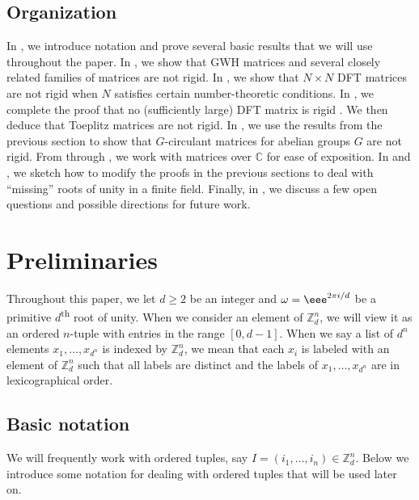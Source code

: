 \documentclass{toc}
\renewcommand\Z{{\mathbb{Z}}}
\renewcommand\C{{\mathbb{C}}}
\newcommand{\ts}{\textsuperscript}
\begin{document}
\subsection{Organization}
In , we introduce notation and prove several basic results that we will use throughout the paper.  In , we show that %
GWH matrices  %
and several closely related families of matrices are not rigid.  In , we show that $N \times N$ %
DFT %
 matrices are not rigid when $N$ satisfies certain number-theoretic
%
conditions.   %
In , we complete the proof that %
no (sufficiently large) DFT matrix is rigid%
. We then deduce that %
%
 Toeplitz matrices are not rigid.  In , we use the results from the previous section to show that 
%
$G$-circulant    %
matrices for abelian groups $G$   %
are not rigid.  {}From  through , we work with matrices over $\C$ for ease of exposition.  In  and , we sketch how to modify the proofs in the previous sections to deal with ``missing'' roots of unity in a finite field.  
%
%
Finally, in , we discuss a few open questions
and possible directions for future work.


\section{Preliminaries}\label{sec_prelim}
Throughout this paper, we let $d \geq 2$ be an integer and $\omega = \eee^{2\pi i/d}$ be a primitive $d$\ts{th} root of unity.  When we consider an element of $\Z_d^n$, we will view it as an ordered $n$-tuple with entries in the range $[0,d-1]$.  When we say a list of $d^n$ elements $x_1, \dots , x_{d^n}$ is indexed by $\Z_d^n$, we mean that each $x_i$ is labeled with an element of $\Z_d^n$ such that all labels are distinct and the labels of $x_1, \dots , x_{d^n}$ are in lexicographical order. 

%
\subsection{Basic notation}     %
We will frequently work with ordered tuples, say $I = (i_1, \dots , i_n) \in \Z_d^n$.  Below we introduce some notation for dealing with ordered tuples that will be used later on.
\end{document}
